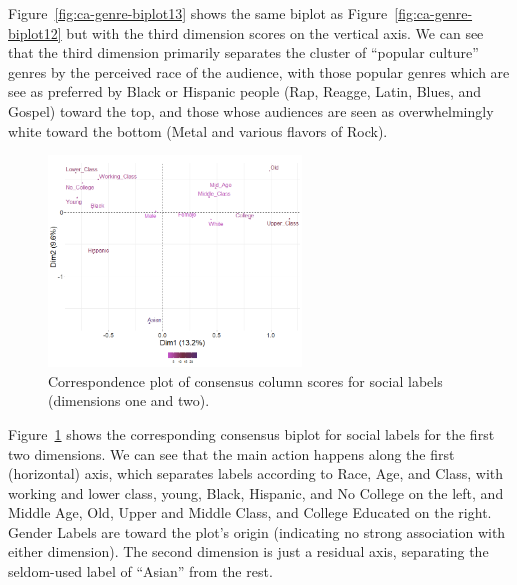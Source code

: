 \documentclass[12pt]{article}
\begin{document}
Figure~\ref{fig:ca-genre-biplot13} shows the same biplot as Figure~\ref{fig:ca-genre-biplot12} but with the third dimension scores on the vertical axis. We can see that the third dimension primarily separates the cluster of ``popular culture'' genres by the perceived race of the audience, with those popular genres which are see as preferred by Black or Hispanic people (Rap, Reagge, Latin, Blues, and Gospel) toward the top, and those whose audiences are seen as overwhelmingly white toward the bottom (Metal and various flavors of Rock). 

\begin{figure}[t]
    \captionsetup[subfigure]{font=footnotesize,labelfont=footnotesize}
    \centering
        \includegraphics[trim={0cm 0cm 0cm 0cm},clip, width=0.6\textwidth]{Plots/ca-label-col12.png}
    \caption{Correspondence plot of consensus column scores for social labels (dimensions one and two).}
    \label{fig:ca-label-biplot12}
\end{figure}

Figure~\ref{fig:ca-label-biplot12} shows the corresponding consensus biplot for social labels for the first two dimensions. We can see that the main action happens along the first (horizontal) axis, which separates labels according to Race, Age, and Class, with working and lower class, young, Black, Hispanic, and No College on the left, and Middle Age, Old, Upper and Middle Class, and College Educated on the right. Gender Labels are toward the plot's origin (indicating no strong association with either dimension). The second dimension is just a residual axis, separating the seldom-used label of ``Asian'' from the rest. 
\end{document}
